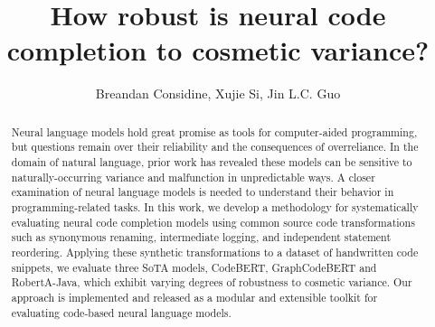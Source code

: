 \documentclass[sigconf,review,anonymous]{acmart}
\begin{document}
  \title{How robust is neural code completion to cosmetic variance?}


  \author{Breandan Considine, Xujie Si, Jin L.C. Guo}


  \begin{abstract}
    Neural language models hold great promise as tools for computer-aided programming, but questions remain over their reliability and the consequences of overreliance. In the domain of natural language, prior work has revealed these models can be sensitive to naturally-occurring variance and malfunction in unpredictable ways. A closer examination of neural language models is needed to understand their behavior in programming-related tasks. In this work, we develop a methodology for systematically evaluating neural code completion models using common source code transformations such as synonymous renaming, intermediate logging, and independent statement reordering. Applying these synthetic transformations to a dataset of handwritten code snippets, we evaluate three SoTA models, CodeBERT, GraphCodeBERT and RobertA-Java, which exhibit varying degrees of robustness to cosmetic variance. Our approach is implemented and released as a modular and extensible toolkit for evaluating code-based neural language models.
  \end{abstract}
\end{document}
